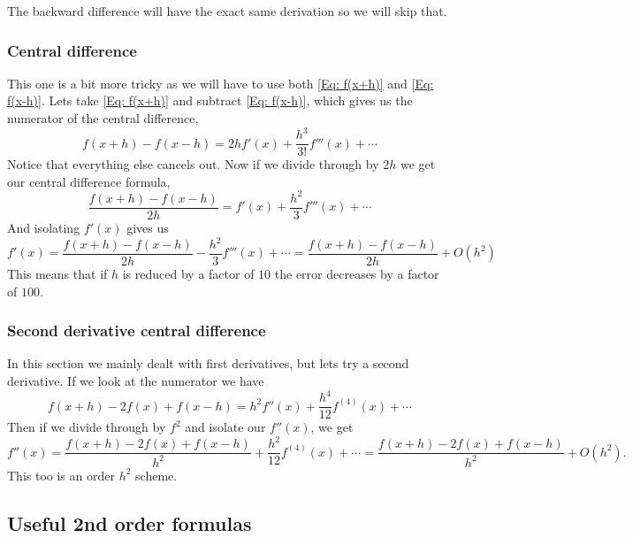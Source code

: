 \documentclass[reqno]{amsart}
\theoremstyle{definition}
\begin{document}
The backward difference will have the exact same derivation so we will skip that.

\subsubsection*{Central difference}

This one is a bit more tricky as we will have to use both \eqref{Eq: f(x+h)} and \eqref{Eq: f(x-h)}.  Lets take \eqref{Eq: f(x+h)} and subtract \eqref{Eq: f(x-h)}, which gives us the numerator of the central difference,
%
\begin{equation*}
f(x+h) - f(x-h) = 2hf'(x) + \frac{h^3}{3!}f'''(x) + \cdots
\end{equation*}
%
Notice that everything else cancels out. Now if we divide through by $2h$ we get our central difference formula,
%
\begin{equation*}
\frac{f(x+h)-f(x-h)}{2h} = f'(x) + \frac{h^2}{3}f'''(x) + \cdots
\end{equation*}
%
And isolating $f'(x)$ gives us
%
\begin{equation*}
f'(x) = \frac{f(x+h)-f(x-h)}{2h} - \frac{h^2}{3}f'''(x) + \cdots = \frac{f(x+h)-f(x-h)}{2h} + O(h^2)
\end{equation*}
%
This means that if $h$ is reduced by a factor of $10$ the error decreases by a factor of $100$.

\subsubsection*{Second derivative central difference}

In this section we mainly dealt with first derivatives, but lets try a second derivative.  If we look at the numerator we have
%
\begin{equation*}
f(x+h) - 2f(x) + f(x-h) = h^2f''(x) + \frac{h^4}{12}f^{(4)}(x) + \cdots
\end{equation*}
%
Then if we divide through by $f^2$ and isolate our $f''(x)$, we get
%
\begin{equation*}
f''(x) = \frac{f(x+h) - 2f(x) + f(x-h)}{h^2} + \frac{h^2}{12}f^{(4)}(x) + \cdots = \frac{f(x+h) - 2f(x) + f(x-h)}{h^2} + O(h^2).
\end{equation*}
%
This too is an order $h^2$ scheme.


\bigskip
\bigskip
\bigskip
\bigskip

\subsection*{Useful 2nd order formulas}
\end{document}
